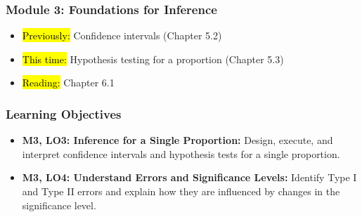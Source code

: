
\begin{frame}
    \frametitle{Module 3: Foundations for Inference}
    \begin{itemize}
        \item \hl{Previously: }Confidence intervals (Chapter 5.2)
        \item \hl{This time: }Hypothesis testing for a proportion (Chapter 5.3)
        \item \hl{Reading: }Chapter 6.1
    \end{itemize}

\end{frame}
\begin{frame}
    \frametitle{Learning Objectives}
    \begin{itemize}
        \item \textbf{M3, LO3: Inference for a Single Proportion:} Design, execute, and interpret confidence intervals and hypothesis tests for a single proportion.
        \item \textbf{M3, LO4: Understand Errors and Significance Levels:} Identify Type I and Type II errors and explain how they are influenced by changes in the significance level.
    \end{itemize}
\end{frame}
